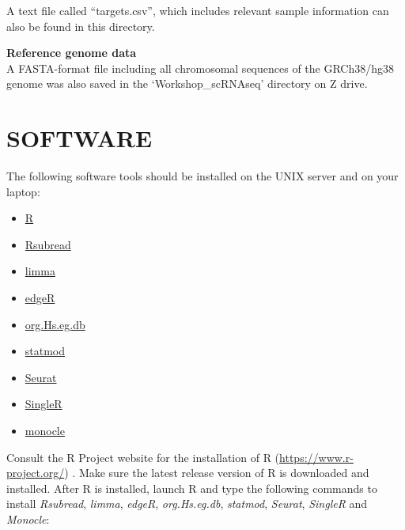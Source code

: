 \documentclass[
  openany]{book}
\providecommand{\tightlist}{%
  \setlength{\itemsep}{0pt}\setlength{\parskip}{0pt}}
\begin{document}
A text file called ``targets.csv'', which includes relevant sample information can also be found in this directory.

\textbf{Reference genome data}\\

A FASTA-format file including all chromosomal sequences of the GRCh38/hg38 genome was also saved in the `Workshop\_scRNAseq' directory on Z drive.

\hypertarget{software}{%
\section{SOFTWARE}\label{software}}

The following software tools should be installed on the UNIX server and on your laptop:

\begin{itemize}
\tightlist
\item
  \href{https://www.r-project.org}{R}
\item
  \href{http://bioconductor.org/packages/release/bioc/html/Rsubread.html}{Rsubread}
\item
  \href{http://bioconductor.org/packages/release/bioc/html/limma.html}{limma}
\item
  \href{http://bioconductor.org/packages/release/bioc/html/edgeR.html}{edgeR}
\item
  \href{http://bioconductor.org/packages/release/data/annotation/html/org.Hs.eg.db.html}{org.Hs.eg.db}
\item
  \href{https://CRAN.R-project.org/package=statmod}{statmod}
\item
  \href{https://cloud.r-project.org/package=Seurat}{Seurat}
\item
  \href{https://bioconductor.org/packages/release/bioc/html/SingleR.html}{SingleR}
\item
  \href{https://bioconductor.org/packages/release/bioc/html/monocle.html}{monocle}
\end{itemize}

Consult the R Project website for the installation of R (\url{https://www.r-project.org/}) \citep{R-base}. Make sure the latest release version of R is downloaded and installed. After R is installed, launch R and type the following commands to install \emph{Rsubread}, \emph{limma}, \emph{edgeR}, \emph{org.Hs.eg.db}, \emph{statmod}, \emph{Seurat}, \emph{SingleR} and \emph{Monocle}:
\end{document}
